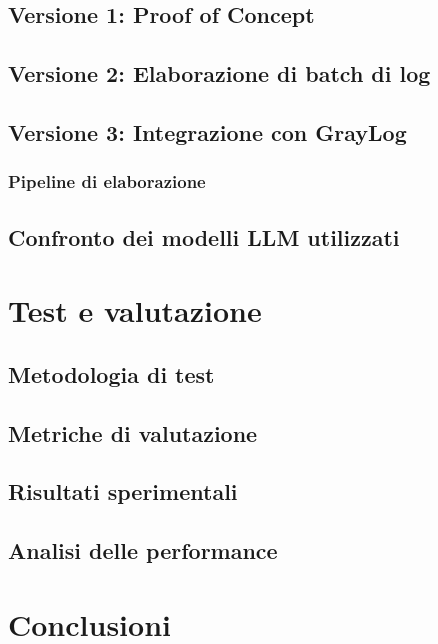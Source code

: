 \documentclass[12pt]{report}
\begin{document}
\section{Versione 1: Proof of Concept}
\label{sec:versione1_poc}
\section{Versione 2: Elaborazione di batch di log}
\label{sec:versione2_batch}
\section{Versione 3: Integrazione con GrayLog}
\label{sec:versione3_graylog}
\subsection{Pipeline di elaborazione}
\label{subsec:pipeline_elaborazione}
\section{Confronto dei modelli LLM utilizzati}
\label{sec:confronto_modelli}


%
%

\chapter{Test e valutazione}
\label{chap:test}

\section{Metodologia di test}
\label{sec:metodologia_test}
\section{Metriche di valutazione}
\label{sec:metriche_test}
\section{Risultati sperimentali}
\label{sec:risultati_sperimentali}
\section{Analisi delle performance}
\label{sec:analisi_performance}


%
%

\chapter{Conclusioni}
\label{chap:conclusioni}
\end{document}
